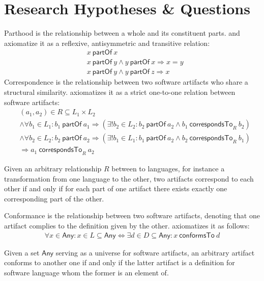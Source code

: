 \documentclass[runningheads,a4paper]{llncs}
\newcommand{\Any}{\textsf{Any}}
\newcommand{\partOf}{~\textsf{partOf}~}
\newcommand{\correspondsToR}[1]{~\textsf{correspondsTo}_{#1}~}
\newcommand{\conformsTo}{~\textsf{conformsTo}~}
\begin{document}
\section{Research Hypotheses \& Questions}
\label{section:ResearchHypthesesAndQuestions}
Parthood is the relationship between a whole and its constituent parts.
\cite{DBLP:journals/dke/Varzi96} and \cite{DBLP:conf/sle/Lammel16} axiomatize it as a reflexive, antisymmetric and transitive relation:
\begin{align*}
&x \partOf x
\\&x \partOf y \wedge y \partOf x \Rightarrow x = y
\\&x \partOf y \wedge y \partOf z \Rightarrow x
\end{align*}
Correspondence is the relationship between two software artifacts who share a structural similarity.
\cite{DBLP:conf/sle/Lammel16} axiomatizes it as a strict one-to-one relation between software artifacts:
\begin{align*}
&(a_1,a_2) \in R \subseteq L_1 \times L_2
\\&\wedge \forall b_1 \in L_1 : b_1 \partOf a_1 \Rightarrow (\exists! b_2 \in L_2 : b_2 \partOf a_2 \wedge b_1 \correspondsToR{R} b_2 )
\\&\wedge \forall b_2 \in L_2 : b_2 \partOf a_2 \Rightarrow (\exists! b_1 \in L_1 : b_1 \partOf a_2 \wedge b_2 \correspondsToR{R} b_1 )
\\&\Rightarrow a_1 \correspondsToR{R} a_2
\end{align*}

Given an arbitrary relationship $R$ between to languages, for instance a transformation from one language to the other, two artifacts correspond to each other if and only if for each part of one artifact there exists exactly one corresponding part of the other.



Conformance is the relationship between two software artifacts, denoting that one artifact complies to the definition given by the other.
\cite{DBLP:conf/sle/Lammel16} axiomatizes it as follows:
\begin{align*}
\forall x \in \Any :
x \in L \subseteq \Any \Leftrightarrow \exists d \in D \subseteq \Any : x \conformsTo d
\end{align*}

Given a set $\Any$ serving as a universe for software artifacts, an arbitrary artifact conforms to another one if and only if the latter artifact is a definition for software language whom the former is an element of.
\end{document}
